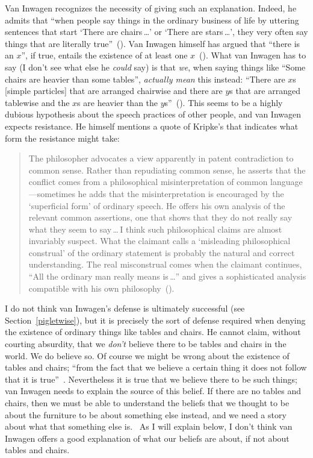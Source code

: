 \documentclass[11pt]{article}
\newenvironment{squote}{\begin{quote}\begin{singlespace}}{\end{singlespace}\end{quote}}
\begin{document}
\begin{spacing}{1.5}
Van Inwagen recognizes the necessity of giving such an explanation. Indeed, he admits that ``when people say things in the ordinary business of life by uttering sentences that start `There are chairs\,\ldots ' or `There are stars\,\ldots ', they very often say things that are literally true''~(\citeyear[102]{inwagen1995}). Van Inwagen himself has argued that ``there is an $x$'', if true, entails the existence of at least one $x$~(\citeyear[237--241]{inwagen1998}). What van Inwagen has to say (I don't see what else he {\em could} say) is that {\em we}, when saying things like ``Some chairs are heavier than some tables'', {\em actually mean} this instead: ``There are $x$s [simple particles] that are arranged chairwise and there are $y$s that are arranged tablewise and the $x$s are heavier than the $y$s''~(\citeyear[109]{inwagen1995}). This seems to be a highly dubious hypothesis about the speech practices of other people, and van Inwagen expects resistance. He himself mentions a quote of Kripke's that indicates what form the resistance might take:
\begin{squote}
The philosopher advocates a view apparently in patent contradiction to common sense. Rather than repudiating common sense, he asserts that the conflict comes from a philosophical misinterpretation of common language---sometimes he adds that the misinterpretation is encouraged  by the `superficial form' of ordinary speech. He offers his own analysis of the relevant common assertions, one that shows that they do not really say what they seem to say\,\ldots\,I think such philosophical claims are almost invariably suspect. What the claimant calls a `misleading philosophical construal' of the ordinary statement is probably the natural and correct understanding. The real misconstrual comes when the claimant continues, ``All the ordinary man really means is\,\ldots '' and gives a sophisticated analysis compatible with his own philosophy~(\citeyear[65]{kripke1982}).
\end{squote}

I do not think van Inwagen's defense is ultimately successful (see Section~\ref{pigletwise}), but it is precisely the sort of defense required when denying the existence of ordinary things like tables and chairs. He cannot claim, without courting absurdity, that we {\em don't} believe there to be tables and chairs in the world. We do believe so. Of course we might be wrong about the existence of tables and chairs; ``from the fact that we believe a certain thing it does not follow that it is true''~\citep[21]{stroud2000a}. Nevertheless it is true that we believe there to be such things; van Inwagen needs to explain the source of this belief. If there are no tables and chairs, then we must be able to understand the beliefs that we thought to be about the furniture to be about something else instead, and we need a story about what that something else is.
\ As I will explain below, I don't think van Inwagen offers a good explanation of what our beliefs are about, if not about tables and chairs.


\end{spacing}
\end{document}

